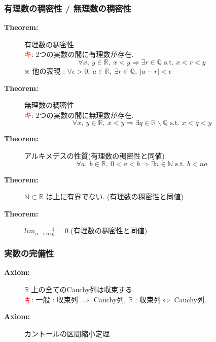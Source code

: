 \documentclass[english,dvipdfmx]{jsarticle}
\newcommand*{\point}{\textcircled{\textcolor{red}{\scriptsize キ}}}
\begin{document}
    \subsubsection{有理数の稠密性 / 無理数の稠密性}
        \begin{description}
            \item[\bf{Theorem:}] 有理数の稠密性 \\
                \point : 2つの実数の間に有理数が存在. 
                \begin{equation*}
                    \forall x,\ y \in \mathbb{R},\ x < y \Rightarrow \exists r \in \mathbb{Q} \text{  s.t. } x < r < y
                \end{equation*}
                ※ 他の表現 : $ \forall \epsilon > 0 ,\ a \in \mathbb{R} ,\ \exists r \in \mathbb{Q},\ | a - r | < \epsilon $
            \item[\bf{Theorem:}] 無理数の稠密性 \\
                \point : 2つの実数の間に無理数が存在. 
                \begin{equation*}
                    \forall x,\ y \in \mathbb{R},\ x < y \Rightarrow \exists q \in \mathbb{R} \backslash \mathbb{Q} \text{  s.t. } x < q < y
                \end{equation*}
            \item[\bf{Theorem:}] アルキメデスの性質(有理数の稠密性と同値)
                \begin{equation*}
                    \forall a,\ b \in \mathbb{R},\ 0 < a < b \Rightarrow \exists n \in \mathbb{N} \text{ s.t. } b < na
                \end{equation*}
            \item[\bf{Theorem:}] $\mathbb{N} \subset \mathbb{R}$ は上に有界でない. (有理数の稠密性と同値)
            \item[\bf{Theorem:}] $lim_{n \to \infty} \frac{1}{n} = 0$ (有理数の稠密性と同値)
        \end{description}
    \subsubsection{実数の完備性}
        \begin{description}
            \item[\bf{Axiom:}] $\mathbb{R}$ 上の全てのCauchy列は収束する. \\
            \point : 一般 : 収束列 $\Rightarrow$ Cauchy列, $\mathbb{R}$ : 収束列$\Leftrightarrow$ Cauchy列.
            \item[\bf{Axiom:}] カントールの区間縮小定理 \\
            
        \end{description}
\end{document}
